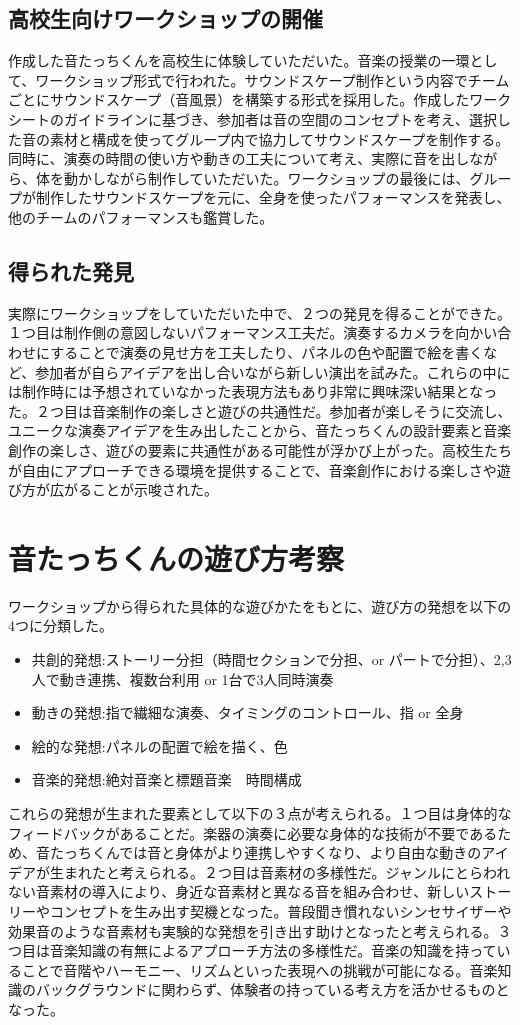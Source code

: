 \documentclass[platex,dvipdfmx]{jlreq}			%
\begin{document}
\subsection{高校生向けワークショップの開催}
作成した音たっちくんを高校生に体験していただいた。音楽の授業の一環として、ワークショップ形式で行われた。サウンドスケープ制作という内容でチームごとにサウンドスケープ（音風景）を構築する形式を採用した。作成したワークシートのガイドラインに基づき、参加者は音の空間のコンセプトを考え、選択した音の素材と構成を使ってグループ内で協力してサウンドスケープを制作する。同時に、演奏の時間の使い方や動きの工夫について考え、実際に音を出しながら、体を動かしながら制作していただいた。ワークショップの最後には、グループが制作したサウンドスケープを元に、全身を使ったパフォーマンスを発表し、他のチームのパフォーマンスも鑑賞した。

\subsection{得られた発見}
実際にワークショップをしていただいた中で、２つの発見を得ることができた。１つ目は制作側の意図しないパフォーマンス工夫だ。演奏するカメラを向かい合わせにすることで演奏の見せ方を工夫したり、パネルの色や配置で絵を書くなど、参加者が自らアイデアを出し合いながら新しい演出を試みた。これらの中には制作時には予想されていなかった表現方法もあり非常に興味深い結果となった。２つ目は音楽制作の楽しさと遊びの共通性だ。参加者が楽しそうに交流し、ユニークな演奏アイデアを生み出したことから、音たっちくんの設計要素と音楽創作の楽しさ、遊びの要素に共通性がある可能性が浮かび上がった。高校生たちが自由にアプローチできる環境を提供することで、音楽創作における楽しさや遊び方が広がることが示唆された。


\section{音たっちくんの遊び方考察}
ワークショップから得られた具体的な遊びかたをもとに、遊び方の発想を以下の4つに分類した。
\begin{itemize}
  \item 共創的発想:ストーリー分担（時間セクションで分担、or パートで分担）、2,3人で動き連携、複数台利用 or 1台で3人同時演奏
  \item 動きの発想:指で繊細な演奏、タイミングのコントロール、指 or 全身
  \item 絵的な発想:パネルの配置で絵を描く、色
  \item 音楽的発想:絶対音楽と標題音楽　時間構成
\end{itemize}
これらの発想が生まれた要素として以下の３点が考えられる。１つ目は身体的なフィードバックがあることだ。楽器の演奏に必要な身体的な技術が不要であるため、音たっちくんでは音と身体がより連携しやすくなり、より自由な動きのアイデアが生まれたと考えられる。２つ目は音素材の多様性だ。ジャンルにとらわれない音素材の導入により、身近な音素材と異なる音を組み合わせ、新しいストーリーやコンセプトを生み出す契機となった。普段聞き慣れないシンセサイザーや効果音のような音素材も実験的な発想を引き出す助けとなったと考えられる。３つ目は音楽知識の有無によるアプローチ方法の多様性だ。音楽の知識を持っていることで音階やハーモニー、リズムといった表現への挑戦が可能になる。音楽知識のバックグラウンドに関わらず、体験者の持っている考え方を活かせるものとなった。
\end{document}
